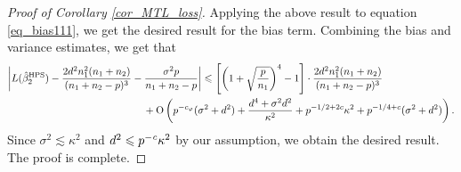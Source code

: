 \begin{proof}[Proof of Corollary \ref{cor_MTL_loss}]
Applying the above result to equation \eqref{eq_bias111}, we get the desired result for the bias term.
Combining the bias and variance estimates, we get that
\begin{align*}
	 \left|L(\hat{\beta}_2^{\MTL})  -  \frac{2d^2 n_1^2 (n_1+n_2)}{(n_1 + n_2 - p)^3} - \frac{\sigma^2 p}{n_1+n_2-p}   \right|&
	  \le   \left[\left( 1+\sqrt{\frac{p}{n_1}}\right)^4-1\right] \cdot \frac{2d^2n_1^2 (n_1+n_2)}{(n_1 + n_2 - p)^3} \\
	&\hspace{-2cm}+\OO\left( p^{-c_\varphi} (\sigma^2 + d^2)+ \frac{d^4 + \sigma^2 d^2}{\kappa^2}+p^{-1/2+2c}\kappa^2 +  p^{-1/4+c} (\sigma^2 +d^2) \right).
\end{align*}
Since $\sigma^2 \lesssim  \kappa^2$ and $d^2 \leqslant p^{-{\mathit{c}}}{\kappa^2}$ by our assumption, we obtain the desired result.
The proof is complete.
\end{proof}
